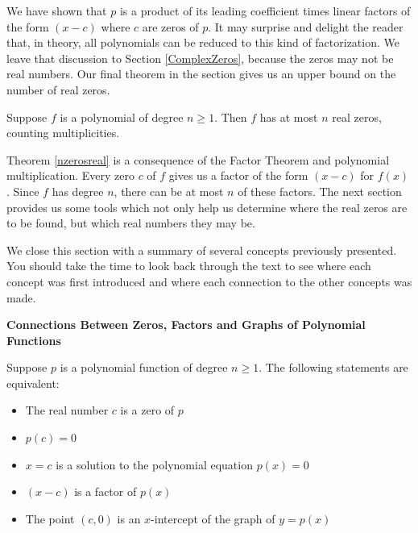 \documentclass{ximera}
\begin{document}
We have shown that $p$ is a product of its leading coefficient times linear factors of the form $(x-c)$ where $c$ are zeros of $p$. It may surprise and delight the reader that, in theory, all polynomials can be reduced to this kind of factorization.  We leave that discussion to Section \ref{ComplexZeros}, because the zeros may not be real numbers.  Our final theorem in the section gives us an upper bound on the number of real zeros. 

 

\begin{theorem}  \label{nzerosreal} 

Suppose $f$ is a polynomial of degree $n \geq 1$.  Then $f$ has at most $n$ real zeros, counting multiplicities.

\end{theorem}

 

Theorem \ref{nzerosreal} is a consequence of the Factor Theorem and polynomial multiplication.  Every zero $c$ of $f$ gives us a factor of the form $(x-c)$ for $f(x)$.  Since $f$ has degree $n$, there can be at most $n$ of these factors.  The next section provides us some tools which not only help us determine where the real zeros are to be found, but which real numbers they may be.

 

We close this section with a summary of several concepts previously presented.  You should take the time to look back through the text to see where each concept was first introduced and where each connection to the other concepts was made.

 


\centerline{\textbf{Connections Between Zeros, Factors and Graphs of Polynomial Functions}}

 

\hspace{.17in} Suppose $p$ is a polynomial function of degree $n \geq 1$.  The following statements are equivalent:

\begin{itemize}

\item The real number $c$ is a zero of $p$
\item $p(c) = 0$
\item $x = c$ is a solution to the polynomial equation $p(x) = 0$
\item $(x - c)$ is a factor of $p(x)$
\item The point $(c, 0)$ is an $x$-intercept of the graph of $y = p(x)$

\end{itemize}




\closegraphsfile
\end{document}
